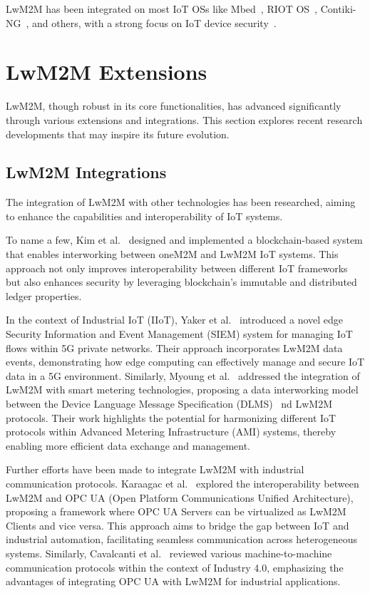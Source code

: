 \documentclass[11pt,sigconf]{iabart}
\begin{document}
LwM2M has been integrated on most IoT OSs like Mbed~\cite{mbed}, RIOT OS~\cite{riot_os}, Contiki-NG~\cite{contiki_ng}, and others, with a strong focus on IoT device security~\cite{pop00010}.

\section{LwM2M Extensions} \label{extensions}

LwM2M, though robust in its core functionalities, has advanced significantly through various extensions and integrations. This section explores recent research developments that may inspire its future evolution.

\subsection{LwM2M Integrations}


The integration of LwM2M with other technologies has been researched, aiming to enhance the capabilities and interoperability of IoT systems. 

To name a few, Kim et al.~\cite{pop00007} designed and implemented a blockchain-based system that enables interworking between oneM2M and LwM2M IoT systems. This approach not only improves interoperability between different IoT frameworks but also enhances security by leveraging blockchain's immutable and distributed ledger properties. 

In the context of Industrial IoT (IIoT), Yaker et al.~\cite{pop00004} introduced a novel edge Security Information and Event Management (SIEM) system for managing IoT flows within 5G private networks. Their approach incorporates LwM2M data events, demonstrating how edge computing can effectively manage and secure IoT data in a 5G environment. Similarly, Myoung et al.~\cite{pop00012} addressed the integration of LwM2M with smart metering technologies, proposing a data interworking model between the Device Language Message Specification (DLMS)~\cite{dlms-spec} nd LwM2M protocols. Their work highlights the potential for harmonizing different IoT protocols within Advanced Metering Infrastructure (AMI) systems, thereby enabling more efficient data exchange and management.

Further efforts have been made to integrate LwM2M with industrial communication protocols. Karaagac et al.~\cite{pop00013} explored the interoperability between LwM2M and OPC UA (Open Platform Communications Unified Architecture), proposing a framework where OPC UA Servers can be virtualized as LwM2M Clients and vice versa. This approach aims to bridge the gap between IoT and industrial automation, facilitating seamless communication across heterogeneous systems. Similarly, Cavalcanti et al.~\cite{pop00014} reviewed various machine-to-machine communication protocols within the context of Industry 4.0, emphasizing the advantages of integrating OPC UA with LwM2M for industrial applications.
\end{document}
